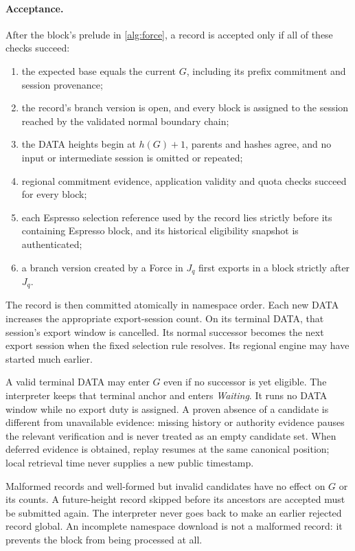 \documentclass[11pt,a4paper]{article}
\newcommand{\defterm}[1]{\textcolor{rrBlue}{\textit{#1}}}
\begin{document}
\paragraph{Acceptance.}
After the block's prelude in \cref{alg:force}, a record is accepted
only if all of these checks succeed:
\begin{enumerate}[label=(\roman*)]
\item the expected base equals the current $G$, including its prefix
commitment and session provenance;
\item the record's branch version is open, and every block is assigned to the
session reached by the validated normal boundary chain;
\item the DATA heights begin at $h(G)+1$, parents and hashes agree,
and no input or intermediate session is omitted or repeated;
\item regional commitment evidence, application validity and quota
checks succeed for every block;
\item each Espresso selection reference used by the record lies
strictly before its containing Espresso block, and its historical
eligibility snapshot is authenticated;
\item a branch version created by a Force in $J_q$ first exports in a block
strictly after $J_q$.
\end{enumerate}
The record is then committed atomically in namespace order.
Each new DATA increases the appropriate export-session count. On its
terminal DATA, that session's export window is cancelled. Its normal
successor becomes the next export session when the fixed selection
rule resolves. Its regional engine may have started much earlier.

A valid terminal DATA may enter $G$ even if no successor is yet
eligible. The interpreter keeps that terminal anchor and enters
\defterm{Waiting}. It runs no DATA window while no export duty is
assigned. A proven absence of a candidate is different from unavailable
evidence: missing history or authority evidence pauses the relevant
verification and is never treated as an empty candidate set.
When deferred evidence is obtained, replay resumes at the same canonical
position; local retrieval time never supplies a new public timestamp.

Malformed records and well-formed but invalid candidates have no
effect on $G$ or its counts. A future-height record skipped before its
ancestors are accepted must be submitted again. The interpreter never
goes back to make an earlier rejected record global. An incomplete
namespace download is not a malformed record: it prevents the block
from being processed at all.
\end{document}
